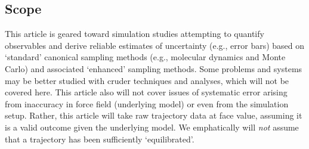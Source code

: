 \subsection{Scope}

This article is geared toward simulation studies attempting to quantify observables and derive reliable estimates of uncertainty (e.g., error bars) based on `standard' canonical sampling methods (e.g., molecular dynamics and Monte Carlo) and associated `enhanced' sampling methods.
Some problems and systems may be better studied with cruder techniques and analyses, which will not be covered here.
This article also will not cover issues of systematic error arising from inaccuracy in force field (underlying model) or even from the simulation setup.
Rather, this article will take raw trajectory data at face value, assuming it is a valid outcome given the underlying model.
We emphatically will \emph{not} assume that a trajectory has been sufficiently `equilibrated'.